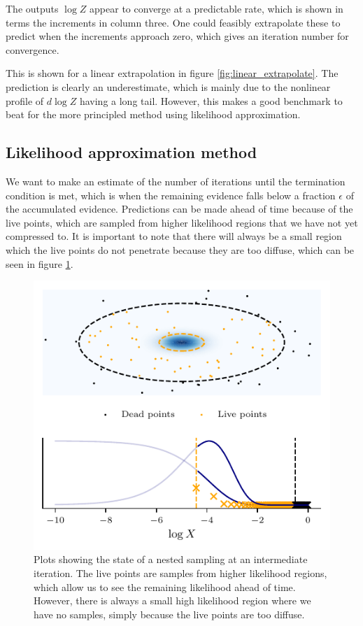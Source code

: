 \documentclass[usenatbib]{mnras} %
\begin{document}
The outputs $\log Z$ appear to converge at a predictable rate, which is shown in terms the increments in column three. One could feasibly extrapolate these to predict when the increments approach zero, which gives an iteration number for convergence. 
\par
This is shown for a linear extrapolation in figure \ref{fig:linear_extrapolate}. The prediction is clearly an underestimate, which is mainly due to the nonlinear profile of $d\log Z$ having a long tail. However, this makes a good benchmark to beat for the more principled method using likelihood approximation. 

\subsection{Likelihood approximation method}
We want to make an estimate of the number of iterations until the termination condition is met, which is when the remaining evidence falls below a fraction $\epsilon$ of the accumulated evidence.
Predictions can be made ahead of time because of the live points, which are sampled from higher likelihood regions that we have not yet compressed to. It is important to note that there will always be a small region which the live points do not penetrate because they are too diffuse, which can be seen in figure \ref{fig:dead_live_points}. 
\begin{figure}
\begin{center}
	\includegraphics{figures/dead_live_points.pdf}
\end{center}
\caption{Plots showing the state of a nested sampling at an intermediate iteration. The live points are samples from higher likelihood regions, which allow us to see the remaining likelihood ahead of time. However, there is always a small high likelihood region where we have no samples, simply because the live points are too diffuse.}
\label{fig:dead_live_points}
\end{figure}
\end{document}
